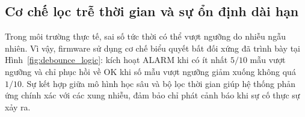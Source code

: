 \subsection{Cơ chế lọc trễ thời gian và sự ổn định dài hạn}

Trong môi trường thực tế, sai số tức thời có thể vượt ngưỡng do nhiễu ngẫu nhiên. Vì vậy, firmware sử dụng cơ chế biểu quyết bất đối xứng đã trình bày tại Hình~\ref{fig:debounce_logic}: kích hoạt ALARM khi có ít nhất $5/10$ mẫu vượt ngưỡng và chỉ phục hồi về OK khi số mẫu vượt ngưỡng giảm xuống không quá $1/10$. Sự kết hợp giữa mô hình học sâu và bộ lọc thời gian giúp hệ thống phản ứng chính xác với các xung nhiễu, đảm bảo chỉ phát cảnh báo khi sự cố thực sự xảy ra.

